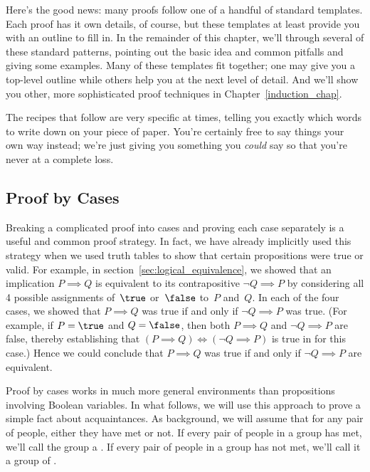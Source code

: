 Here's the good news: many proofs follow one of a handful of standard
templates.  Each proof has it own details, of course, but these
templates at least provide you with an outline to fill in.  In the
remainder of this chapter, we'll
through several of these standard patterns, pointing out the basic
idea and common pitfalls and giving some examples.  Many of these
templates fit together; one may give you a top-level outline while
others help you at the next level of detail.  And we'll show you
other, more sophisticated proof techniques in
Chapter~\ref{induction_chap}.

The recipes that follow are very specific at times, telling you exactly
which words to write down on your piece of paper.  You're certainly
free to say things your own way instead; we're just giving you
something you \textit{could} say so that you're never at a complete
loss.

\subsection{Proof by Cases}

Breaking a complicated proof into cases and proving each case
separately is a useful and common proof strategy.  In fact, we have
already implicitly used this strategy when we used truth tables to
show that certain propositions were true or valid.  For example, in
section~\ref{sec:logical_equivalence}, we showed that an implication
$P \implies Q$ is equivalent to its contrapositive $\lnot Q \implies
P$ by considering all 4 possible assignments of~$\true$ or~$\false$
to~$P$ and~$Q$.  In each of the four cases, we showed that $P \implies
Q$ was true if and only if $\lnot Q \implies P$ was true.  (For
example, if $P = \true$ and $Q = \false$, then both $P \implies Q$ and
$\lnot Q \implies P$ are false, thereby establishing that $(P \implies
Q) \iff (\lnot Q \implies P)$ is true in for this case.)  Hence we
could conclude that $P \implies Q$ was true if and only if $\lnot Q
\implies P$ are equivalent.

Proof by cases works in much more general environments than
propositions involving Boolean variables.  In what follows, we will
use this approach to prove a simple fact about acquaintances.  As
background, we will assume that for any pair of people, either they
have met or not.  If every pair of people in a group has met, we'll
call the group a .  If every pair of people in a group has
not met, we'll call it a group of .

